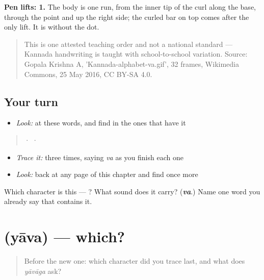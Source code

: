 \textbf{Pen lifts: 1.} The body is one run, from the inner tip of the curl along the base, through the point and up the right side; the curled bar on top comes after the only lift. It is  without the dot.

\begin{quote}
This is one attested teaching order and not a national standard — Kannada handwriting is taught with school-to-school variation. Source: Gopala Krishna A, 'Kannada-alphabet-va.gif', 32 frames, Wikimedia Commons, 25 May 2016, CC BY-SA 4.0.
\end{quote}

\subsection*{Your turn}
\begin{itemize}
\raggedright
  \item \emph{Look:} at these words, and find  in the ones that have it
\end{itemize}

\begin{quote}
  ·    ·  
\end{quote}

\begin{itemize}
\raggedright
  \item \emph{Trace it:}  three times, saying \emph{va} as you finish each one
  \item \emph{Look:} back at any page of this chapter and find  once more
\end{itemize}

\begin{tcolorbox}[breakable,colback=teal!4,colframe=teal!35!black,title={Before you move on}]
Which character is this — ? What sound does it carry? (\emph{\textbf{va}}.) Name one word you already say that contains it.
\end{tcolorbox}
\section[\texorpdfstring{\kn{ಯಾವ} (yāva)}{ಯಾವ (yāva)}]{ (yāva) — which?}

\label{lesson:KA-C71-which}



\begin{quote}
Before the new one: which character did you trace last, and what does \emph{yāvāga} ask?
\end{quote}

